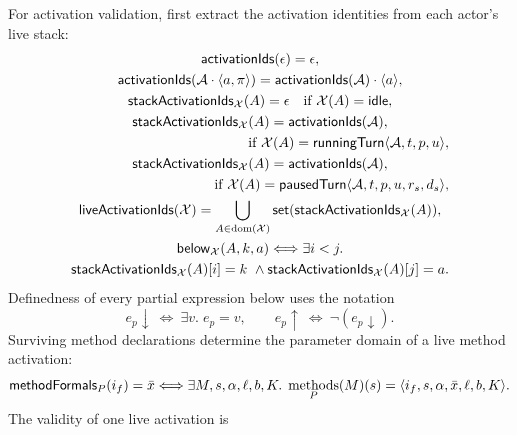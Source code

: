 For activation validation, first extract the activation identities from each
actor's live stack:
\begin{equation}\label{eq:live-activation-order}
\begin{gathered}
 \mathsf{activationIds}(\epsilon)=\epsilon,\\
 \mathsf{activationIds}(\mathcal A\mathbin{\cdot}\langle a,\pi\rangle)
   =\mathsf{activationIds}(\mathcal A)\mathbin{\cdot}\langle a\rangle,\\
 \mathsf{stackActivationIds}_{\mathcal X}(A)=\epsilon
   \quad\text{if }\mathcal X(A)=\kw{idle},\\
 \mathsf{stackActivationIds}_{\mathcal X}(A)=\mathsf{activationIds}(\mathcal A),\\
 \hfill\text{if }\mathcal X(A)=\kw{runningTurn}\langle\mathcal A,t,p,u\rangle,\\
 \mathsf{stackActivationIds}_{\mathcal X}(A)=\mathsf{activationIds}(\mathcal A),\\
 \hfill\text{if }\mathcal X(A)=
   \kw{pausedTurn}\langle\mathcal A,t,p,u,r_s,d_s\rangle,\\
 \mathsf{liveActivationIds}(\mathcal X)
   =\bigcup_{A\in\dom(\mathcal X)}
       \mathsf{set}(\mathsf{stackActivationIds}_{\mathcal X}(A)),\\
 \mathsf{below}_{\mathcal X}(A,k,a)\Longleftrightarrow\exists i<j.\\
 \mathsf{stackActivationIds}_{\mathcal X}(A)[i]=k\ \land
 \mathsf{stackActivationIds}_{\mathcal X}(A)[j]=a.
\end{gathered}
\end{equation}
Definedness of every partial expression below uses the notation
\begin{equation}\label{eq:definedness-notation}
 e_p\downarrow\ \Longleftrightarrow\ \exists v.\;e_p=v,
 \qquad e_p\uparrow\ \Longleftrightarrow\ \neg(e_p\downarrow).
\end{equation}
Surviving method declarations determine the parameter domain of a live method
activation:
\begin{equation}\label{eq:method-formals}
 \mathsf{methodFormals}_{P}(i_f)=\bar x
 \Longleftrightarrow
 \exists M,s,\alpha,\ell,b,K.\;
 \mathop{\mathrm{methods}}_P(M)(s)=\langle i_f,s,\alpha,\bar x,\ell,b,K\rangle.
\end{equation}
The validity of one live activation is
